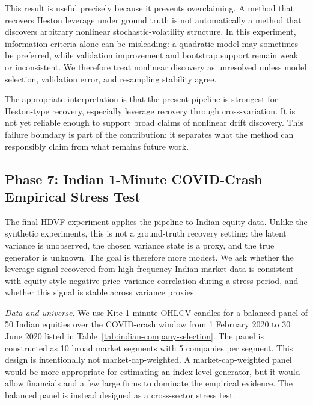 \documentclass[reprint, amsmath, amssymb, aps, prl, superscriptaddress, nofootinbib]{revtex4-2}
\begin{document}
This result is useful precisely because it prevents overclaiming. A method that recovers Heston leverage under ground truth is not automatically a method that discovers arbitrary nonlinear stochastic-volatility structure. In this experiment, information criteria alone can be misleading: a quadratic model may sometimes be preferred, while validation improvement and bootstrap support remain weak or inconsistent. We therefore treat nonlinear discovery as unresolved unless model selection, validation error, and resampling stability agree.

The appropriate interpretation is that the present pipeline is strongest for Heston-type recovery, especially leverage recovery through cross-variation. It is not yet reliable enough to support broad claims of nonlinear drift discovery. This failure boundary is part of the contribution: it separates what the method can responsibly claim from what remains future work.

\subsection{Phase 7: Indian 1-Minute COVID-Crash Empirical Stress Test}

The final HDVF experiment applies the pipeline to Indian equity data. Unlike the synthetic experiments, this is not a ground-truth recovery setting: the latent variance is unobserved, the chosen variance state is a proxy, and the true generator is unknown. The goal is therefore more modest. We ask whether the leverage signal recovered from high-frequency Indian market data is consistent with equity-style negative price--variance correlation during a stress period, and whether this signal is stable across variance proxies.

\textit{Data and universe.}
We use Kite 1-minute OHLCV candles for a balanced panel of 50 Indian equities over the COVID-crash window from 1 February 2020 to 30 June 2020 listed in Table~\ref{tab:indian-company-selection}. The panel is constructed as 10 broad market segments with 5 companies per segment. This design is intentionally not market-cap-weighted. A market-cap-weighted panel would be more appropriate for estimating an index-level generator, but it would allow financials and a few large firms to dominate the empirical evidence. The balanced panel is instead designed as a cross-sector stress test.
\end{document}
